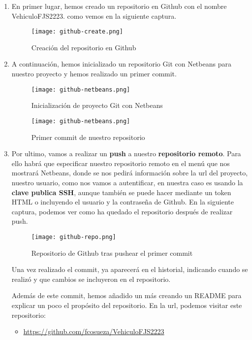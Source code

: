 \begin{enumerate}
    \item En primer lugar, hemos creado un repositorio en Github con el nombre VehiculoFJS2223. como vemos en la siguiente captura.

    \begin{figure}[H]
        \centering
        \texttt{[image: github-create.png]}
        \caption{Creación del repositorio en Github}
    \end{figure}

    \item A continuación, hemos inicializado un repositorio Git con Netbeans para nuestro proyecto y hemos realizado un primer commit.

    \begin{figure}[H]
        \centering
        \texttt{[image: github-netbeans.png]}
        \caption{Inicialización de proyecto Git con Netbeans}
    \end{figure}


    \begin{figure}[H]
        \centering
        \texttt{[image: github-netbeans.png]}
        \caption{Primer commit de nuestro repositorio}
    \end{figure}

        \item Por ultimo, vamos a realizar un \textbf{push} a nuestro\textbf{ repositorio remoto}. Para ello habrá que especificar nuestro repositorio remoto en el menú que nos mostrará Netbeans, donde se nos pedirá información sobre la url del proyecto, nuestro usuario, como nos vamos a autentificar, en nuestra caso es usando la \textbf{clave publica SSH}, aunque también se puede hacer mediante un token HTML o incluyendo el usuario y la contraseña de Github. En la siguiente captura, podemos ver como ha quedado el repositorio después de realizar push.

     \begin{figure}[ht]
        \centering
        \texttt{[image: github-repo.png]}
        \caption{Repositorio de Github tras pushear el primer commit}
    \end{figure}

    Una vez realizado el commit, ya aparecerá en el historial, indicando cuando se realizó y que cambios se incluyeron en el repositorio.

    Además de este commit, hemos añadido un más creando un README para explicar un poco el propósito del repositorio.
    En la url, podemos visitar este repositorio:

    \begin{itemize}
        \item \url{https://github.com/fcosueza/VehiculoFJS2223}
    \end{itemize}
\end{enumerate}


